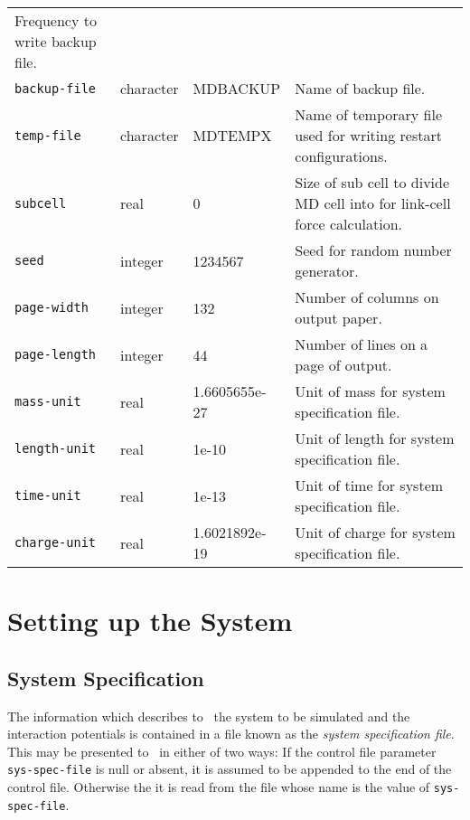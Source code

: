 \begin{table}
\begin{minipage}{\textwidth}
\begin{tabular}{|l|l|l|p{2.7in}|}
Frequency to write backup file. \\
\verb'backup-file' &            character  &    MDBACKUP &
Name of backup file. \\ \hline
\verb'temp-file' &              character  &    MDTEMPX &
Name of temporary file used for writing restart configurations. \\ \hline
\verb'subcell' &                real &                  0 &
Size of sub cell to divide MD cell into for link-cell force
calculation. \\ \hline
\verb'seed' &                   integer &               1234567 &
Seed for random number generator. \\ \hline
\verb'page-width' &             integer &               132 & 
Number of columns on output paper. \\
\verb'page-length' &    integer &               44 &
Number of lines on a page of output. \\ \hline
\verb'mass-unit' &              real &                  1.6605655e-27 &
Unit of mass for system specification file. \\
\verb'length-unit' &            real &                  1e-10 &
Unit of length for system specification file. \\
\verb'time-unit' &              real &                  1e-13 &
Unit of time for system specification file. \\
\verb'charge-unit' &            real &                  1.6021892e-19 &
Unit of charge for system specification file. \\ \hline
\end{tabular}
\end{minipage}
\end{table}

\section{Setting up the System}%
\subsection{System Specification}
\label{sec:sys-spec}

The information which describes to \moldy\  the system to be simulated
and the interaction potentials is contained in a file known as the
{\em system specification file}.  This may be presented to \moldy\  in
either of two ways: If the control file parameter \verb'sys-spec-file'
is null or absent, it is assumed to be appended to the end of the
control file.  Otherwise the it is read from the file whose name is
the value of \verb'sys-spec-file'.

